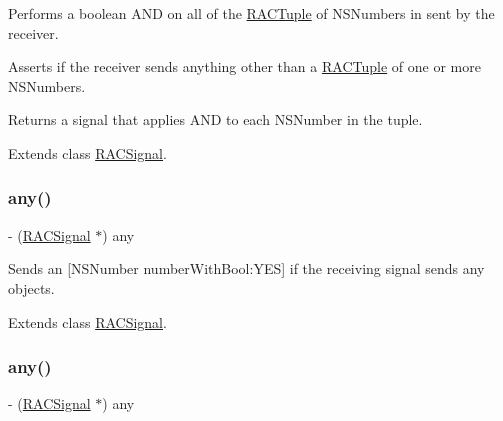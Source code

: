 Performs a boolean A\+ND on all of the \mbox{\hyperlink{interface_r_a_c_tuple}{R\+A\+C\+Tuple}} of N\+S\+Numbers in sent by the receiver.

Asserts if the receiver sends anything other than a \mbox{\hyperlink{interface_r_a_c_tuple}{R\+A\+C\+Tuple}} of one or more N\+S\+Numbers.

Returns a signal that applies A\+ND to each N\+S\+Number in the tuple. 

Extends class \mbox{\hyperlink{interface_r_a_c_signal_a4a12f1ef58487260894d1ef37dbb9c9d}{R\+A\+C\+Signal}}.

\mbox{\label{category_r_a_c_signal_07_operations_08_af64359cf92ab95039f48270a71446e08}} 
\subsubsection{\texorpdfstring{any()}{any()}\hspace{0.1cm}{\footnotesize\ttfamily [1/3]}}
{\footnotesize\ttfamily -\/ (\mbox{\hyperlink{interface_r_a_c_signal}{R\+A\+C\+Signal}} $\ast$) any \begin{DoxyParamCaption}{ }\end{DoxyParamCaption}}

Sends an \mbox{[}N\+S\+Number number\+With\+Bool\+:Y\+ES\mbox{]} if the receiving signal sends any objects. 

Extends class \mbox{\hyperlink{interface_r_a_c_signal_af64359cf92ab95039f48270a71446e08}{R\+A\+C\+Signal}}.

\mbox{\label{category_r_a_c_signal_07_operations_08_af64359cf92ab95039f48270a71446e08}} 
\subsubsection{\texorpdfstring{any()}{any()}\hspace{0.1cm}{\footnotesize\ttfamily [2/3]}}
{\footnotesize\ttfamily -\/ (\mbox{\hyperlink{interface_r_a_c_signal}{R\+A\+C\+Signal}} $\ast$) any \begin{DoxyParamCaption}{ }\end{DoxyParamCaption}}

